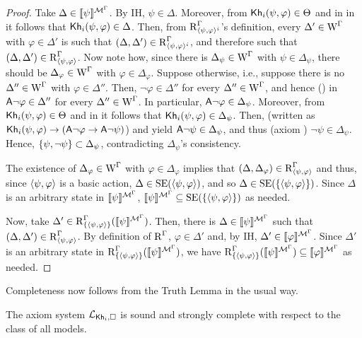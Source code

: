 \begin{proof}
Take $\Delta \in \llbracket \psi \rrbracket^{\mathcal{M}^\Gamma}$. By IH, $\psi \in \Delta$.
Moreover, from ${\sf Kh}_i(\psi, \varphi) \in \Theta$ and  in  in  it follows that ${\sf Kh}_i(\psi, \varphi) \in \Delta$.
Then, from $\operatorname{R}^\Gamma_{\langle \psi,\varphi \rangle^i}$'s definition, every $\Delta' \in \operatorname{W}^\Gamma$ with $\varphi \in \Delta'$ is such that $(\Delta, \Delta') \in \operatorname{R}^\Gamma_{\langle \psi,\varphi \rangle^i}$, and therefore such that $(\Delta, \Delta') \in \operatorname{R}^\Gamma_{\langle \psi,\varphi \rangle}$.
Now note how, since there is $\Delta_\psi \in \operatorname{W}^\Gamma$ with $\psi \in \Delta_\psi$, there should be $\Delta_\varphi \in \operatorname{W}^\Gamma$ with $\varphi \in \Delta_\varphi$.
Suppose otherwise, i.e., suppose there is no $\Delta'' \in \operatorname{W}^\Gamma$ with $\varphi \in \Delta''$. Then, $\lnot \varphi \in \Delta''$ for every $\Delta'' \in \operatorname{W}^\Gamma$, and hence () in~ ${\sf A}\lnot\varphi \in \Delta''$ for every $\Delta'' \in \operatorname{W}^\Gamma$.
In particular, ${\sf A}\lnot\varphi \in \Delta_\psi$. Moreover, from ${\sf Kh}_i(\psi, \varphi) \in \Theta$ and  in  it follows that ${\sf Kh}_i(\psi, \varphi) \in \Delta_\psi$. Then,  (written as ${\sf Kh}_i(\psi, \varphi) \rightarrow ({\sf A}\lnot \varphi \rightarrow {\sf A} \lnot \psi)$) and  yield ${\sf A}\lnot\psi \in \Delta_\psi$, and thus (axiom ) $\lnot\psi \in \Delta_\psi$.
Hence, $\{ \psi, \lnot\psi \} \subset \Delta_\psi$, contradicting $\Delta_\psi$'s consistency.

The existence of $\Delta_\varphi \in \operatorname{W}^\Gamma$ with $\varphi \in \Delta_\varphi$ implies that $(\Delta, \Delta_\varphi) \in \operatorname{R}^\Gamma_{\langle \psi,\varphi \rangle}$ and thus, since $\langle \psi,\varphi \rangle$ is a basic action, $\Delta \in \operatorname{SE}(\langle \psi,\varphi \rangle)$, and so $\Delta \in \operatorname{SE}(\{ \langle \psi,\varphi \rangle \})$. Since $\Delta$ is an arbitrary state in $\llbracket \psi \rrbracket^{\mathcal{M}^\Gamma}$, $\llbracket \psi \rrbracket^{\mathcal{M}^\Gamma} \subseteq \operatorname{SE}(\{ \langle \psi,\varphi \rangle \})$ as needed.

Now, take $\Delta' \in \operatorname{R}^\Gamma_{\{ \langle \psi,\varphi \rangle \}}(\llbracket \psi \rrbracket^{\mathcal{M}^\Gamma})$. Then, there is $\Delta \in \llbracket \psi \rrbracket^{\mathcal{M}^\Gamma}$ such that $(\Delta, \Delta') \in \operatorname{R}^\Gamma_{\langle \psi,\varphi \rangle}$. By definition of $\operatorname{R}^\Gamma$, $\varphi \in \Delta'$ and, by IH, $\Delta' \in \llbracket \varphi \rrbracket^{\mathcal{M}^\Gamma}$. Since $\Delta'$ is an arbitrary state in $\operatorname{R}^\Gamma_{\{ \langle \psi,\varphi \rangle \}}(\llbracket \psi \rrbracket^{\mathcal{M}^\Gamma})$, we have $\operatorname{R}^\Gamma_{\{ \langle \psi,\varphi \rangle \}}(\llbracket \psi \rrbracket^{\mathcal{M}^\Gamma}) \subseteq \llbracket \varphi \rrbracket^{\mathcal{M}^\Gamma}$ as needed.
\end{proof}

Completeness now follows from the Truth Lemma in the usual way. 

\medskip

\begin{theorem}\label{th:cm-ults-khikt-completeness}
The axiom system $\mathcal{L}_{{\sf Kh}_i,\square}$ is sound and strongly complete with respect to the class of all models.
\end{theorem}
\medskip